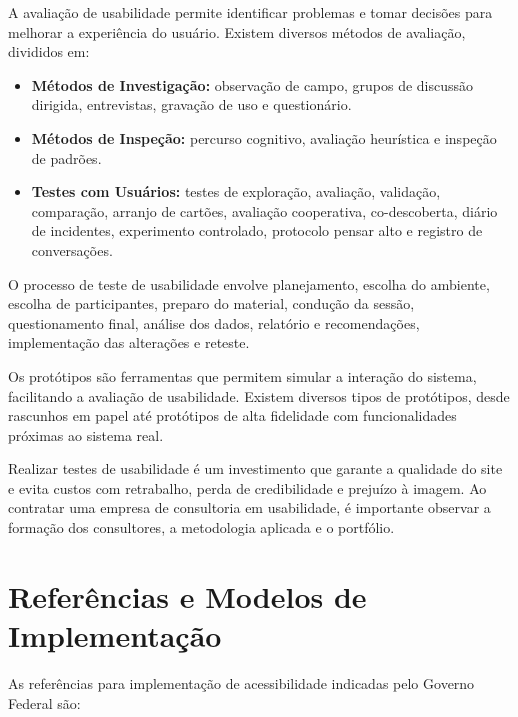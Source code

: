 \documentclass[
  12pt,
  openright,
  twoside,
  a4paper,
  english,
  french,
  spanish,
  brazil
]{abntex2}
\begin{document}
A avaliação de usabilidade permite identificar problemas e tomar decisões para
melhorar a experiência do usuário. Existem diversos métodos de avaliação,
divididos em:

\begin{itemize}
  \item
    \textbf{Métodos de Investigação:} observação de campo, grupos de discussão
    dirigida, entrevistas, gravação de uso e questionário.
  \item
    \textbf{Métodos de Inspeção:} percurso cognitivo, avaliação heurística e
    inspeção de padrões.
  \item
    \textbf{Testes com Usuários:} testes de exploração, avaliação, validação,
    comparação, arranjo de cartões, avaliação cooperativa, co-descoberta, diário
    de incidentes, experimento controlado, protocolo pensar alto e registro de
    conversações.
\end{itemize}

O processo de teste de usabilidade envolve planejamento, escolha do ambiente,
escolha de participantes, preparo do material, condução da sessão,
questionamento final, análise dos dados, relatório e recomendações,
implementação das alterações e reteste.

Os protótipos são ferramentas que permitem simular a interação do sistema,
facilitando a avaliação de usabilidade. Existem diversos tipos de protótipos,
desde rascunhos em papel até protótipos de alta fidelidade com funcionalidades
próximas ao sistema real.

Realizar testes de usabilidade é um investimento que garante a qualidade do site
e evita custos com retrabalho, perda de credibilidade e prejuízo à imagem. Ao
contratar uma empresa de consultoria em usabilidade, é importante observar a
formação dos consultores, a metodologia aplicada e o portfólio.

\chapter{Referências e Modelos de Implementação}

As referências para implementação de acessibilidade indicadas pelo Governo
Federal são:
\end{document}

